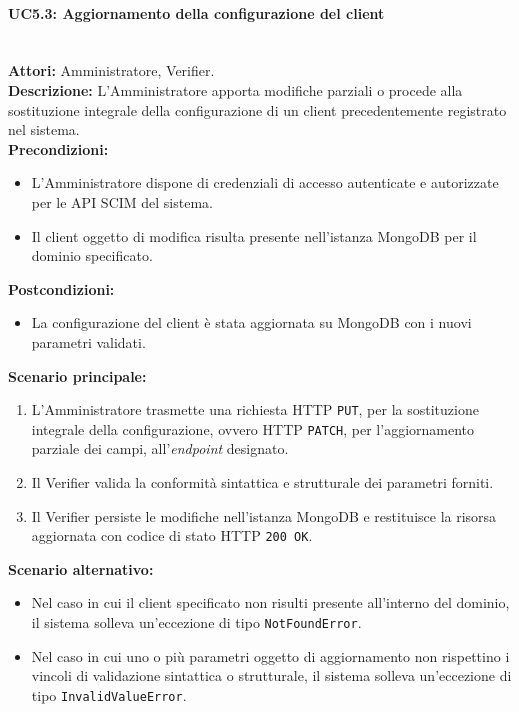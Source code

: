 \paragraph{\large\bfseries UC5.3: Aggiornamento della configurazione del client}
\label{uc:verifier:uc5.3}
\mbox{}\\
\noindent\textbf{Attori:} Amministratore, Verifier.
\\
\noindent\textbf{Descrizione:} L'Amministratore apporta modifiche parziali o procede alla sostituzione integrale della configurazione di un client precedentemente registrato nel sistema.
\\
\noindent\textbf{Precondizioni:}
\begin{itemize}
    \item L'Amministratore dispone di credenziali di accesso autenticate e autorizzate per le API SCIM del sistema.
    \item Il client oggetto di modifica risulta presente nell'istanza MongoDB per il dominio specificato.
\end{itemize}
\noindent\textbf{Postcondizioni:}
\begin{itemize}
    \item La configurazione del client è stata aggiornata su MongoDB con i nuovi parametri validati.
\end{itemize}

\noindent\textbf{Scenario principale:}
\begin{enumerate}
    \item L'Amministratore trasmette una richiesta HTTP \texttt{PUT}, per la sostituzione integrale della configurazione, ovvero HTTP \texttt{PATCH}, per l'aggiornamento parziale dei campi, all'\textit{endpoint} designato.
    \item Il Verifier valida la conformità sintattica e strutturale dei parametri forniti.
    \item Il Verifier persiste le modifiche nell'istanza MongoDB e restituisce la risorsa aggiornata con codice di stato HTTP \texttt{200 OK}.
\end{enumerate}

\noindent\textbf{Scenario alternativo:}
\begin{itemize}
    \item Nel caso in cui il client specificato non risulti presente all'interno del dominio, il sistema solleva un'eccezione di tipo \texttt{NotFoundError}.
    \item Nel caso in cui uno o più parametri oggetto di aggiornamento non rispettino i vincoli di validazione sintattica o strutturale, il sistema solleva un'eccezione di tipo \texttt{InvalidValueError}.
\end{itemize}

